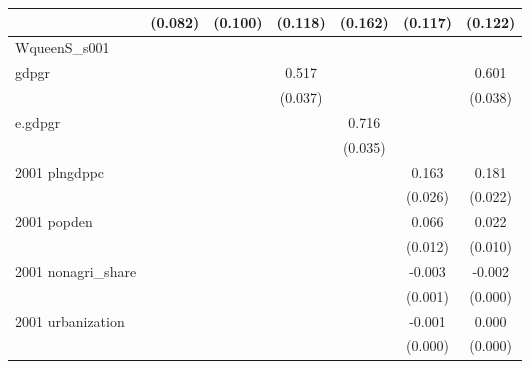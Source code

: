 \begin{table}[htbp]
\begin{tabular}{l*{6}{c}}
                    &     (0.082)         &     (0.100)         &     (0.118)         &     (0.162)         &     (0.117)         &     (0.122)         \\
\hline
WqueenS\_s001        &                     &                     &                     &                     &                     &                     \\
gdpgr               &                     &                     &       0.517\sym{***}&                     &                     &       0.601\sym{***}\\
                    &                     &                     &     (0.037)         &                     &                     &     (0.038)         \\
e.gdpgr             &                     &                     &                     &       0.716\sym{***}&                     &                     \\
                    &                     &                     &                     &     (0.035)         &                     &                     \\
2001 plngdppc       &                     &                     &                     &                     &       0.163\sym{***}&       0.181\sym{***}\\
                    &                     &                     &                     &                     &     (0.026)         &     (0.022)         \\
2001 popden         &                     &                     &                     &                     &       0.066\sym{***}&       0.022\sym{**} \\
                    &                     &                     &                     &                     &     (0.012)         &     (0.010)         \\
2001 nonagri\_share  &                     &                     &                     &                     &      -0.003\sym{***}&      -0.002\sym{***}\\
                    &                     &                     &                     &                     &     (0.001)         &     (0.000)         \\
2001 urbanization   &                     &                     &                     &                     &      -0.001\sym{***}&       0.000         \\
                    &                     &                     &                     &                     &     (0.000)         &     (0.000)         \\

\end{tabular}
\end{table}
